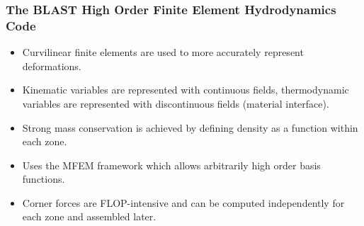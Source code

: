\documentclass[8pt,xcolor=svgnames]{beamer}
\begin{document}
\begin{frame}\frametitle{ The BLAST High Order Finite Element Hydrodynamics Code}

\begin{itemize}
  \item Curvilinear finite elements are used to more accurately represent deformations.
  \item Kinematic variables are represented with  continuous fields, thermodynamic variables are represented with discontinuous fields (material interface).
  \item Strong mass conservation is achieved by defining density as a function within each zone.
  \item Uses the MFEM framework which allows arbitrarily high order  basis functions.
  \item Corner forces are FLOP-intensive and can be computed independently for each zone and assembled later.

\end{itemize}


\end{frame}
\end{document}
